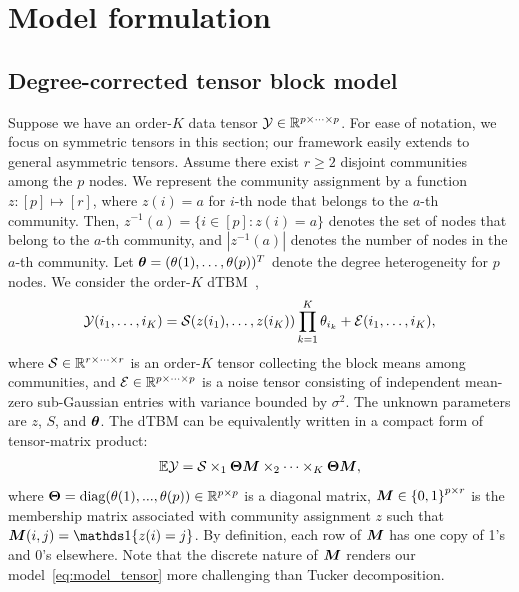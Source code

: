 \documentclass[lettersize,journal]{IEEEtran}
\theoremstyle{definition}
\theoremstyle{definition}
\newcommand{\offf}[1]{\left\{#1\right\}}
\begin{document}
\section{Model formulation}\label{sec:model}

\subsection{Degree-corrected tensor block model}

Suppose we have an order-$K$ data tensor $\mathcal{Y} \in \mathbb{R}^{p \times \cdots \times p}$. For ease of notation, we focus on symmetric tensors in this section; our framework easily extends to general asymmetric tensors. Assume there exist $r \geq 2$  disjoint communities among the $p$ nodes. We represent the community assignment by a function $z \colon [p]\mapsto[r]$, where $z(i) = a$ for $i$-th node that belongs to the $a$-th community. Then, $z^{-1}(a)=\{i\in[p]\colon z(i)=a\}$ denotes the set of nodes that belong to the $a$-th community, and $|z^{-1}(a)|$ denotes the number of nodes in the $a$-th community.
Let $\boldsymbol{\theta}=(\theta(1),\ldots,\theta(p))^T$ denote the degree heterogeneity for $p$ nodes. We consider the order-$K$ dTBM~\citep{ghoshdastidar2017consistency,ke2019community},
\begin{equation}\label{eq:model_margin}
    \tY(i_1,\ldots,i_K) = \tS(z(i_1),\ldots,z(i_K)) \prod_{k = 1}^K\theta_{i_k} + \tE(i_1,\ldots,i_K), 
\end{equation}
\normalsize
where $\mathcal{S} \in \mathbb{R}^{r \times \cdots \times r}$ is an order-$K$ tensor collecting the block means among communities, and $\mathcal{E}\in\mathbb{R}^{p\times \cdots \times p}$ is a noise tensor consisting of independent mean-zero sub-Gaussian entries with variance bounded by $\sigma^2$. The unknown parameters are $z$, $S$, and $\boldsymbol{\theta}$. The dTBM can be equivalently written in a compact form of tensor-matrix product:
\begin{equation}\label{eq:model_tensor}
 \mathbb{E}\tY = \tS \times_1 \mTheta \mM \times_2 \cdots \times_K  \mTheta \mM,
\end{equation}
where $\boldsymbol{\Theta} = \text{diag}(\theta(1),...,\theta(p)) \in \mathbb{R}^{p \times p}$ is a diagonal matrix, $\mM \in \offf{0,1}^{p \times r}$ is the membership matrix associated with community assignment $z$ such that $\mM(i,j)=\ind\{z(i)=j\}$. By definition, each row of $\bm M$ has one copy of 1's and 0's elsewhere. Note that the discrete nature of $\bm M$ renders our model~\eqref{eq:model_tensor} more challenging than Tucker decomposition. %
\end{document}
